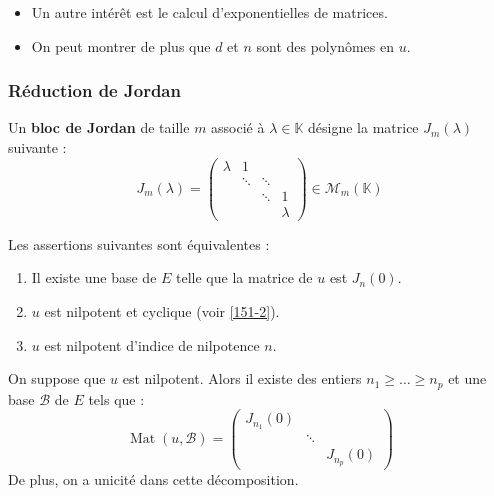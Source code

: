 	\begin{remark}
		\begin{itemize}
		  \item Un autre intérêt est le calcul d'exponentielles de matrices.
		  \item On peut montrer de plus que $d$ et $n$ sont des polynômes en $u$.
		\end{itemize}
	\end{remark}

	\subsubsection{Réduction de Jordan}


	\begin{definition}
		Un \textbf{bloc de Jordan} de taille $m$ associé à $\lambda \in \mathbb{K}$ désigne la matrice $J_m(\lambda)$ suivante :
		\[ J_m(\lambda) = \begin{pmatrix} \lambda & 1 & \\ & \ddots & \ddots & \\ & & \ddots & 1 \\ & & & \lambda \end{pmatrix} \in \mathcal{M}_m(\mathbb{K}) \]
	\end{definition}

	\begin{proposition}
		Les assertions suivantes sont équivalentes :
		\begin{enumerate}[label=(\roman*)]
			\item Il existe une base de $E$ telle que la matrice de $u$ est $J_n(0)$.
			\item $u$ est nilpotent et cyclique (voir \cref{151-2}).
			\item $u$ est nilpotent d'indice de nilpotence $n$.
		\end{enumerate}
	\end{proposition}

	\begin{theorem}
		On suppose que $u$ est nilpotent. Alors il existe des entiers $n_1 \geq \dots \geq n_p$ et une base $\mathcal{B}$ de $E$ tels que :
		\[ \operatorname{Mat}(u, \mathcal{B}) = \begin{pmatrix} J_{n_1}(0) & & \\ & \ddots & \\ & & J_{n_p}(0) \end{pmatrix} \]
		De plus, on a unicité dans cette décomposition.
	\end{theorem}

